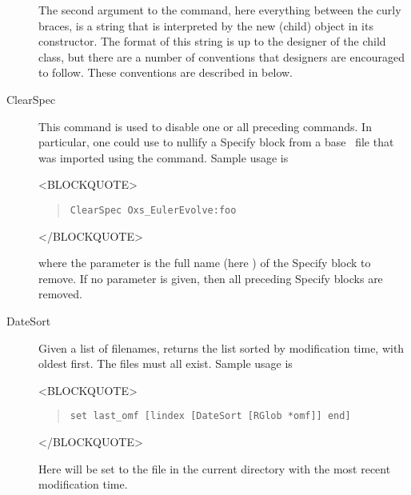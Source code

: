 \begin{description}
The second argument to the  command, here everything between
the curly braces, is a string that is interpreted by the new
 (child) object in its constructor.  The format of this
string is up to the designer of the child class, but there are a number
of conventions that designers are encouraged to follow.  These
conventions are described in
 below.

\item[ClearSpec\label{html:mif2ClearSpec}]
This command is used to disable one or all preceding 
commands.  In particular, one could use  to nullify a
Specify block from a base \MIF\ file that was imported using the
 command.  Sample usage is
\begin{rawhtml}
<BLOCKQUOTE>
\end{rawhtml}
\begin{quote}
\begin{verbatim}
ClearSpec Oxs_EulerEvolve:foo
\end{verbatim}
\end{quote}
\begin{rawhtml}
</BLOCKQUOTE>
\end{rawhtml}
where the parameter is the full name (here ) of
the Specify block to remove.  If no parameter is given, then all
preceding Specify blocks are removed.

\item[DateSort\label{html:mif2datesort}]
Given a list of filenames, returns the list sorted by modification
time, with oldest first. The files must all exist. Sample usage is
\begin{rawhtml}
  <BLOCKQUOTE>
\end{rawhtml}
\begin{quote}
\begin{verbatim}
set last_omf [lindex [DateSort [RGlob *omf]] end]
\end{verbatim}
\end{quote}
\begin{rawhtml}
  </BLOCKQUOTE>
\end{rawhtml}
Here  will be set to the  file in the current
directory with the most recent modification time.


\end{description}
